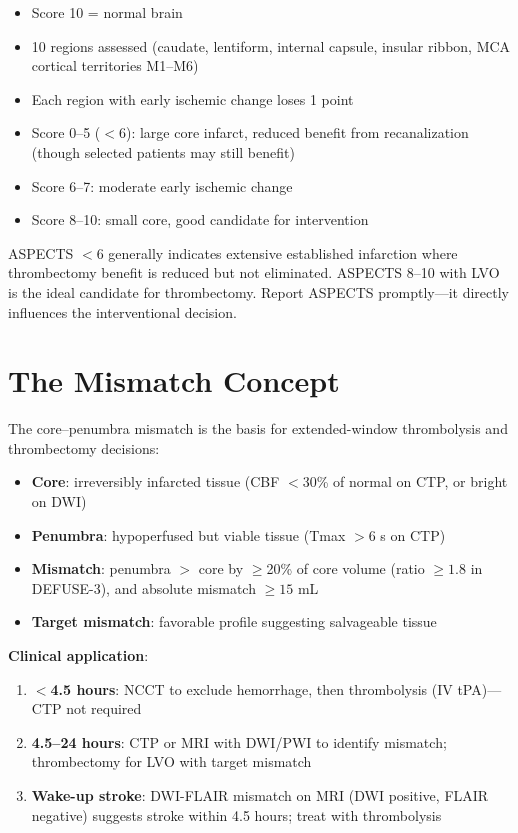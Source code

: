 \begin{itemize}
  \item Score 10 = normal brain
  \item 10 regions assessed (caudate, lentiform, internal capsule, insular ribbon, MCA cortical territories M1--M6)
  \item Each region with early ischemic change loses 1 point
  \item Score 0--5 ($<6$): large core infarct, reduced benefit from recanalization (though selected patients may still benefit)
  \item Score 6--7: moderate early ischemic change
  \item Score 8--10: small core, good candidate for intervention
\end{itemize}

\begin{pearlbox}
ASPECTS $<$6 generally indicates extensive established infarction where thrombectomy benefit is reduced but not eliminated. ASPECTS 8--10 with LVO is the ideal candidate for thrombectomy. Report ASPECTS promptly---it directly influences the interventional decision.
\end{pearlbox}

\section{The Mismatch Concept}
The core--penumbra mismatch is the basis for extended-window thrombolysis and thrombectomy decisions:

\begin{itemize}
  \item \textbf{Core}: irreversibly infarcted tissue (CBF $<$30\% of normal on CTP, or bright on DWI)
  \item \textbf{Penumbra}: hypoperfused but viable tissue (Tmax $>$6 s on CTP)
  \item \textbf{Mismatch}: penumbra $>$ core by $\geq$20\% of core volume (ratio $\geq 1.8$ in DEFUSE-3), and absolute mismatch $\geq 15$ mL
  \item \textbf{Target mismatch}: favorable profile suggesting salvageable tissue
\end{itemize}

\textbf{Clinical application}:
\begin{enumerate}
  \item \textbf{$<$4.5 hours}: NCCT to exclude hemorrhage, then thrombolysis (IV tPA)---CTP not required
  \item \textbf{4.5--24 hours}: CTP or MRI with DWI/PWI to identify mismatch; thrombectomy for LVO with target mismatch
  \item \textbf{Wake-up stroke}: DWI-FLAIR mismatch on MRI (DWI positive, FLAIR negative) suggests stroke within 4.5 hours; treat with thrombolysis
\end{enumerate}

